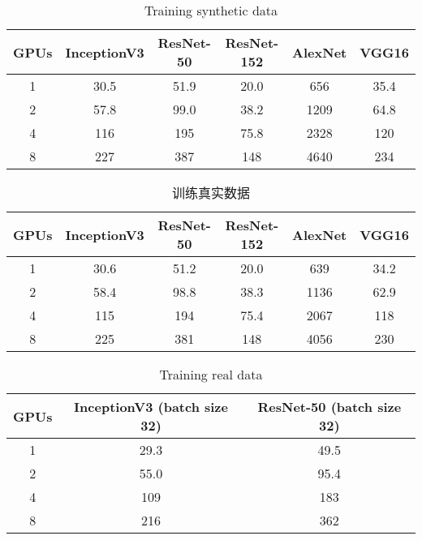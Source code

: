 \begin{table}[H]
	\centering
	\begin{tabular}{|c|c|c|c|c|c|}
		\hline
		GPUs	&InceptionV3	&ResNet-50	&ResNet-152	&AlexNet	&VGG16\\
		\hline
		1	&30.5	&51.9	&20.0	&656	&35.4\\
		\hline
		2	&57.8	&99.0	&38.2	&1209	&64.8\\
		\hline
		4	&116	&195	&75.8	&2328	&120\\
		\hline
		8	&227	&387	&148	&4640	&234\\
		\hline
	\end{tabular}
	\caption{Training synthetic data}
\end{table}
\begin{table}[H]
	\centering
	\begin{tabular}{|c|c|c|c|c|c|}
		\hline
		GPUs	&InceptionV3	&ResNet-50	&ResNet-152	&AlexNet	&VGG16\\
		\hline
		1	&30.6	&51.2	&20.0	&639	&34.2\\
		\hline
		2	&58.4	&98.8	&38.3	&1136	&62.9\\
		\hline
		4	&115	&194	&75.4	&2067	&118\\
		\hline
		8	&225	&381	&148	&4056	&230\\
		\hline
	\end{tabular}
	\caption{训练真实数据}
\end{table}
\begin{table}[H]
	\centering
	\begin{tabular}{|c|c|c|}
		\hline
		GPUs	&InceptionV3 (batch size 32)	&ResNet-50 (batch size 32)\\
		\hline
		1	&29.3	&49.5\\
		\hline
		2	&55.0	&95.4\\
		\hline
		4	&109	&183\\
		\hline
		8	&216	&362\\
		\hline
	\end{tabular}
	\caption{Training real data}
\end{table}
